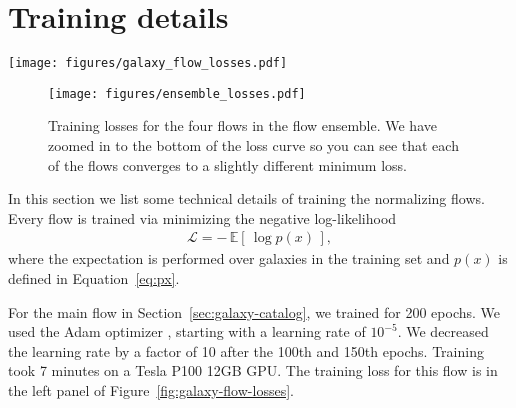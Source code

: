 \documentclass[twocolumn,twocolappendix]{aastex631}
\begin{document}

\appendix

\section{Training details}
\label{app:training-details}

\begin{figure*}[t!]
    \begin{centering}
        \texttt{[image: figures/galaxy\_flow\_losses.pdf]}
        \caption{
            Training losses for the normalizing flows used to simulate the galaxy catalog.
            Left: losses for the regular flow.
            Right: losses for the conditional flow.
        }
        \label{fig:galaxy-flow-losses}
    \end{centering}
\end{figure*}

\begin{figure}[t!]
    \begin{centering}
        \texttt{[image: figures/ensemble\_losses.pdf]}
        \caption{
            Training losses for the four flows in the flow ensemble.
            We have zoomed in to the bottom of the loss curve so you can see that each of the flows converges to a slightly different minimum loss.
        }
        \label{fig:ensemble-losses}
    \end{centering}
\end{figure}

In this section we list some technical details of training the normalizing flows.
Every flow is trained via minimizing the negative log-likelihood
\begin{align}
    \mathcal{L} = - \, \mathbb{E}[ \, \log p(x) \, ],
\end{align}
where the expectation is performed over galaxies in the training set and $p(x)$ is defined in Equation~\ref{eq:px}.

For the main flow in Section~\ref{sec:galaxy-catalog}, we trained for 200 epochs.
We used the Adam optimizer \citep{adam}, starting with a learning rate of $10^{-5}$.
We decreased the learning rate by a factor of 10 after the 100th and 150th epochs.
Training took 7 minutes on a Tesla P100 12GB GPU.
The training loss for this flow is in the left panel of Figure~\ref{fig:galaxy-flow-losses}.
\end{document}
